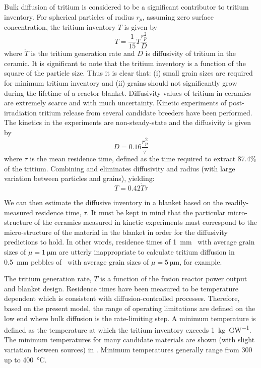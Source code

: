 Bulk diffusion of tritium is considered to be a significant contributor to tritium inventory. For spherical particles of radius $r_p$, assuming zero surface concentration, the tritium inventory $T$ is given by 
\begin{equation}\label{eq:inventory-diff}
T = \frac{1}{15}\dot{T}\frac{r_p^2}{D}
\end{equation}
where $\dot{T}$ is the tritium generation rate and $D$ is diffusivity of tritium in the ceramic. It is significant to note that the tritium inventory is a function of the square of the particle size. Thus it is clear that: (i) small grain sizes are required for minimum tritium inventory and (ii) grains should not significantly grow during the lifetime of a reactor blanket. Diffusivity values of tritium in ceramics are extremely scarce and with much uncertainty. Kinetic experiments of post-irradiation tritium release from several candidate breeders have been performed. The kinetics in the experiments are non-steady-state and the diffusivity is given by 
\begin{equation}\label{eq:exp-diff}
D = 0.16 \frac{r_p^2}{\tau}
\end{equation}
where $\tau$ is the mean residence time, defined as the time required to extract 87.4\% of the tritium. Combining  and  eliminates diffusivity and radius (with large variation between particles and grains), yielding:
\begin{equation}
T = 0.42 \dot{T}\tau
\end{equation}

We can then estimate the diffusive inventory in a blanket based on the readily-measured residence time, $\tau$. It must be kept in mind that the particular micro-structure of the ceramics measured in kinetic experiments must correspond to the micro-structure of the material in the blanket in order for the diffusivity predictions to hold. In other words, residence times of \SI{1}{\milli\meter} \lit~with average grain sizes of $\mu = \SI{1}{\micro\meter}$ are utterly inappropriate to calculate tritium diffusion in \SI{0.5}{\milli\meter} pebbles of \lis~with average grain sizes of $\mu = \SI{5}{\micro\meter}$, for example.

The tritium generation rate, $\dot{T}$ is a function of the fusion reactor power output and blanket design. Residence times have been measured to be temperature dependent which is consistent with diffusion-controlled processes. Therefore, based on the present model, the range of operating limitations are defined on the low end where bulk diffusion is the rate-limiting step. A minimum temperature is defined as the temperature at which the tritium inventory exceeds \SI{1}{\kilo\gram\per\giga\watt}. The minimum temperatures for many candidate materials are shown (with slight variation between sources) in . Minimum temperatures generally range from 300 up to \SI{400}{\celsius}.


